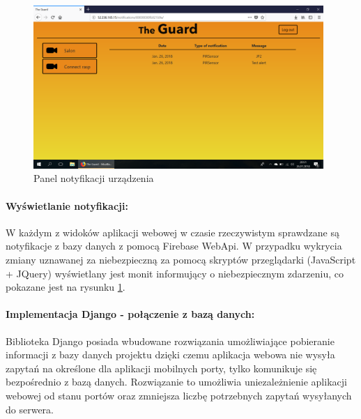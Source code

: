 \begin{figure}[ht]
	\centering
	\includegraphics[width=11cm]{web_screenshots/rasp_notifications.png}
	\caption{Panel notyfikacji urządzenia}
	\label{web_rasp_notifications}
\end{figure}


\paragraph{Wyświetlanie notyfikacji:} W każdym z widoków aplikacji webowej w czasie rzeczywistym sprawdzane są notyfikacje z bazy danych z pomocą Firebase WebApi. W przypadku wykrycia zmiany uznawanej za niebezpieczną za pomocą skryptów przeglądarki (JavaScript + JQuery) wyświetlany jest monit informujący o niebezpiecznym zdarzeniu, co pokazane jest na rysunku \ref{web_rasp_notifications}.  


\paragraph{Implementacja Django - połączenie z bazą danych:}
Biblioteka Django posiada wbudowane rozwiązania umożliwiające pobieranie informacji z bazy danych projektu dzięki czemu aplikacja webowa nie wysyła zapytań na określone dla aplikacji mobilnych porty, tylko komunikuje się bezpośrednio z bazą danych. Rozwiązanie to umożliwia uniezależnienie aplikacji webowej od stanu portów oraz zmniejsza liczbę potrzebnych zapytań wysyłanych do serwera.
